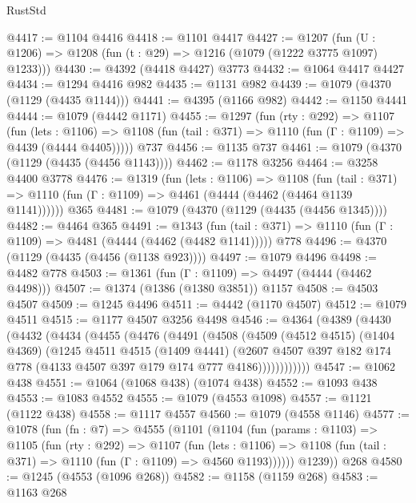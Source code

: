 \begin{lexlean}{RustStd}
\begin{coremodule}
{\begin{coremodule}
{{{{{{{{{{@4417 := @1104 @4416
@4418 := @1101 @4417
@4427 := @1207 (fun (U : @1206) => @1208 (fun (t : @29) => @1216 (@1079 (@1222 @3775 @1097) @1233)))
@4430 := @4392 (@4418 @4427) @3773
@4432 := @1064 @4417 @4427
@4434 := @1294 @4416 @982
@4435 := @1131 @982
@4439 := @1079 (@4370 (@1129 (@4435 @1144)))
@4441 := @4395 (@1166 @982)
@4442 := @1150 @4441
@4444 := @1079 (@4442 @1171)
@4455 := @1297
    (fun (rty : @292) =>
    @1107
      (fun (lets : @1106) =>
      @1108 (fun (tail : @371) => @1110 (fun (Γ : @1109) => @4439 (@4444 @4405)))))
    @737
@4456 := @1135 @737
@4461 := @1079 (@4370 (@1129 (@4435 (@4456 @1143))))
@4462 := @1178 @3256
@4464 := @3258 @4400 @3778
@4476 := @1319
    (fun (lets : @1106) =>
    @1108
      (fun (tail : @371) => @1110 (fun (Γ : @1109) => @4461 (@4444 (@4462 (@4464 @1139 @1141))))))
    @365
@4481 := @1079 (@4370 (@1129 (@4435 (@4456 @1345))))
@4482 := @4464 @365
@4491 := @1343
    (fun (tail : @371) => @1110 (fun (Γ : @1109) => @4481 (@4444 (@4462 (@4482 @1141)))))
    @778
@4496 := @4370 (@1129 (@4435 (@4456 (@1138 @923))))
@4497 := @1079 @4496
@4498 := @4482 @778
@4503 := @1361 (fun (Γ : @1109) => @4497 (@4444 (@4462 @4498)))
@4507 := @1374 (@1386 (@1380 @3851)) @1157
@4508 := @4503 @4507
@4509 := @1245 @4496
@4511 := @4442 (@1170 @4507)
@4512 := @1079 @4511
@4515 := @1177 @4507 @3256 @4498
@4546 := @4364
    (@4389
      (@4430
        (@4432
          (@4434
            (@4455
              (@4476
                (@4491
                  (@4508
                    (@4509
                      (@4512 @4515)
                      (@1404 @4369)
                      (@1245
                        @4511
                        @4515
                        (@1409 @4441)
                        (@2607
                          @4507
                          @397
                          @182
                          @174
                          @778
                          (@4133 @4507 @397 @179 @174 @777 @4186))))))))))))
@4547 := @1062 @438
@4551 := @1064 (@1068 @438) (@1074 @438)
@4552 := @1093 @438
@4553 := @1083 @4552
@4555 := @1079 (@4553 @1098)
@4557 := @1121 (@1122 @438)
@4558 := @1117 @4557
@4560 := @1079 (@4558 @1146)
@4577 := @1078
    (fun (fn : @7) =>
    @4555
      (@1101
        (@1104
          (fun (params : @1103) =>
          @1105
            (fun (rty : @292) =>
            @1107
              (fun (lets : @1106) =>
              @1108 (fun (tail : @371) => @1110 (fun (Γ : @1109) => @4560 @1193))))))
        @1239))
    @268
@4580 := @1245 (@4553 (@1096 @268))
@4582 := @1158 (@1159 @268)
@4583 := @1163 @268
}}}}}}}}}}
\end{coremodule}}
\end{coremodule}
\end{lexlean}
